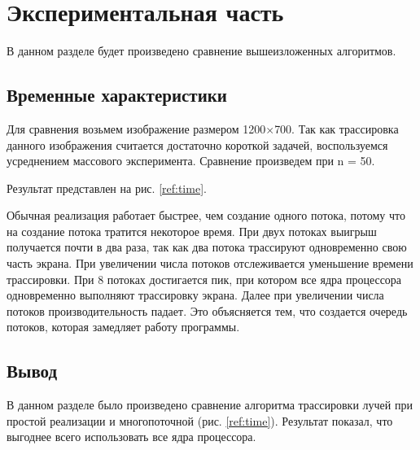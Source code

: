 \chapter{Экспериментальная часть}

В данном разделе будет произведено сравнение вышеизложенных алгоритмов.

\section{Временные характеристики}

Для сравнения возьмем изображение размером 1200$\times$700.
Так как трассировка данного изображения считается достаточно короткой
задачей, воспользуемся усреднением массового эксперимента.
Сравнение произведем при n = 50. 

Результат представлен на рис.  \ref{ref:time}.

\begin{figure}[ht!]
\end{figure}


Обычная реализация работает быстрее, чем создание одного потока,
потому что на создание потока тратится некоторое время. 
При двух потоках выигрыш получается почти в два раза, так как два потока 
трассируют одновременно свою часть экрана. 
При увеличении числа потоков отслеживается уменьшение времени трассировки. 
При 8 потоках достигается пик, при котором все ядра процессора одновременно 
выполняют трассировку экрана. 
Далее при увеличении числа потоков производительность падает. 
Это объясняется тем, что создается очередь потоков, которая замедляет 
работу программы. 

\section{Вывод}

В данном разделе было произведено сравнение алгоритма трассировки лучей
при простой реализации и многопоточной (рис. \ref{ref:time}). Результат показал, что
выгоднее всего использовать все ядра процессора.